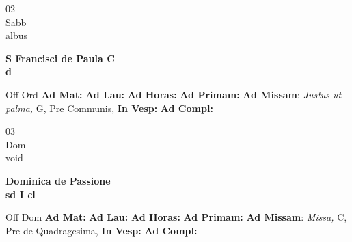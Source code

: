 \documentclass[10pt, openany]{book}
\begin{document}
    \begin{center}
        \begin{minipage}{3.5in}
            \vspace{2em}
            \begin{minipage}{0.5in}
                {\Huge 02} \\
                {\normalsize Sabb} \\
                {\normalsize albus}
            \end{minipage}
            \begin{minipage}{3.0in}
                \textbf{ \large S Francisci de Paula C \\
                \textnormal{\normalsize d}} \\ 
            \end{minipage}
            \begin{justify}Off Ord
                \textbf{Ad Mat: }
                \textbf{Ad Lau: }
                \textbf{Ad Horas: }
                \textbf{Ad Primam: }\textbf{Ad Missam}: \textit{Justus ut palma,} G, Pre Communis,  
                \textbf{In Vesp: }
                \textbf{Ad Compl: }
            \end{justify}
        \end{minipage}
    \end{center}

    \begin{center}
        \begin{minipage}{3.5in}
            \vspace{2em}
            \begin{minipage}{0.5in}
                {\Huge 03} \\
                {\normalsize Dom} \\
                {\normalsize void}
            \end{minipage}
            \begin{minipage}{3.0in}
                \textbf{ \large Dominica de Passione \\
                \textnormal{\normalsize sd I cl}} \\ 
            \end{minipage}
            \begin{justify}Off Dom
                \textbf{Ad Mat: }
                \textbf{Ad Lau: }
                \textbf{Ad Horas: }
                \textbf{Ad Primam: }\textbf{Ad Missam}: \textit{Missa,} C, Pre de Quadragesima,  
                \textbf{In Vesp: }
                \textbf{Ad Compl: }
            \end{justify}
        \end{minipage}
    \end{center}
\end{document}
